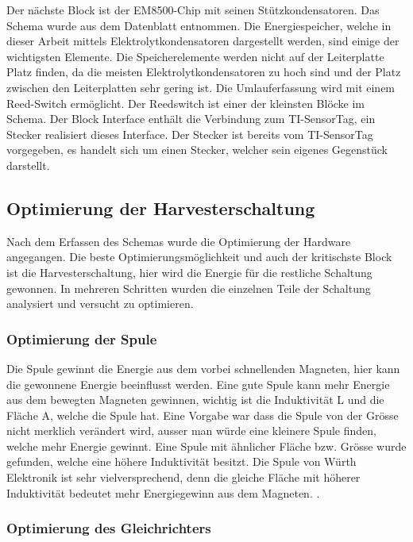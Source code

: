 Der nächste Block ist der EM8500-Chip mit seinen Stützkondensatoren. Das Schema wurde aus dem Datenblatt entnommen. 
Die Energiespeicher, welche in dieser Arbeit mittels Elektrolytkondensatoren dargestellt werden, sind einige der wichtigsten Elemente. Die Speicherelemente werden nicht auf der Leiterplatte Platz finden, da die meisten Elektrolytkondensatoren zu hoch sind und der Platz zwischen den Leiterplatten sehr gering ist. 
Die Umlauferfassung wird mit einem Reed-Switch ermöglicht. Der Reedswitch ist einer der kleinsten Blöcke im Schema.
Der Block Interface enthält die Verbindung zum TI-SensorTag, ein Stecker realisiert dieses Interface. Der Stecker ist bereits vom TI-SensorTag vorgegeben, es handelt sich um einen Stecker, welcher sein eigenes Gegenstück darstellt. 

\subsection{Optimierung der Harvesterschaltung}

Nach dem Erfassen des Schemas wurde die Optimierung der Hardware angegangen. Die beste Optimierungsmöglichkeit und auch der kritischste Block ist die Harvesterschaltung, hier wird die Energie für die restliche Schaltung gewonnen. In mehreren Schritten wurden die einzelnen Teile der Schaltung analysiert und versucht zu optimieren.

\subsubsection{Optimierung der Spule}

Die Spule gewinnt die Energie aus dem vorbei schnellenden Magneten, hier kann die gewonnene Energie beeinflusst werden. Eine gute Spule kann mehr Energie aus dem bewegten Magneten gewinnen, wichtig ist die Induktivität L und die Fläche A, welche die Spule hat. Eine Vorgabe war dass die Spule von der Grösse nicht merklich verändert wird, ausser man würde eine kleinere Spule finden, welche mehr Energie gewinnt. Eine Spule mit ähnlicher Fläche bzw. Grösse wurde gefunden, welche eine höhere Induktivität besitzt. Die Spule von Würth Elektronik ist sehr vielversprechend, denn die gleiche Fläche mit höherer Induktivität bedeutet mehr Energiegewinn aus dem Magneten.
.

\subsubsection{Optimierung des Gleichrichters}

